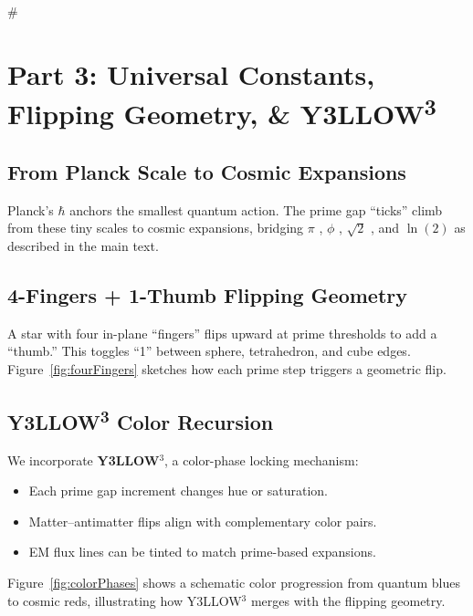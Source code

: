 #  \documentclass[11pt]{article}
\begin{document}
\clearpage

\section{Part 3: Universal Constants, Flipping Geometry, \& Y3LLOW\textsuperscript{3}}
\label{part3}

\subsection{From Planck Scale to Cosmic Expansions}
Planck’s \(\hbar\) \cite{Planck1900} anchors the smallest quantum action. The prime gap “ticks” climb from these tiny scales to cosmic expansions, bridging \(\pi\) \cite{Archimedes287BC}, \(\phi\) \cite{Fibonacci1202}, \(\sqrt{2}\) \cite{Pythagoras500BC}, and \(\ln(2)\) \cite{Euler1736} as described in the main text.

\subsection{4-Fingers + 1-Thumb Flipping Geometry}
A star with four in-plane “fingers” flips upward at prime thresholds to add a “thumb.” This toggles “1” between sphere, tetrahedron, and cube edges. Figure~\ref{fig:fourFingers} sketches how each prime step triggers a geometric flip.

\subsection{Y3LLOW\textsuperscript{3} Color Recursion}
We incorporate \textbf{Y3LLOW$^3$}, a color-phase locking mechanism:
\begin{itemize}
    \item Each prime gap increment changes hue or saturation.
    \item Matter–antimatter flips align with complementary color pairs.
    \item EM flux lines can be tinted to match prime-based expansions.
\end{itemize}
Figure~\ref{fig:colorPhases} shows a schematic color progression from quantum blues to cosmic reds, illustrating how Y3LLOW$^3$ merges with the flipping geometry.

\clearpage

\end{document}
